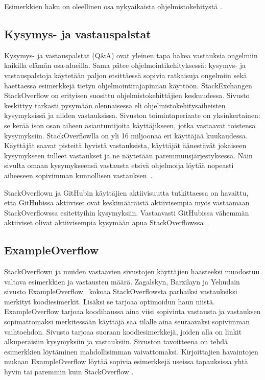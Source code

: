 \documentclass[finnish]{tktltiki2}
\theoremstyle{definition}
\theoremstyle{remark}
\begin{document}
Esimerkkien haku on oleellinen osa nykyaikaista ohjelmistokehitystä \cite{example-overflow-social-media-for-code-recommendations}.


\subsection{Kysymys- ja vastauspalstat}
Kysymys- ja vastauspalstat (Q\&A) ovat yleinen tapa hakea vastauksia ongelmiin kaikilla elämän osa-alueilla. Sama pätee ohjelmointikehityksessä: kysymys- ja vastauspalstoja käytetään paljon etsittäessä sopivia ratkaisuja ongelmiin sekä haettaessa esimerkkejä tietyn ohjelmointirajapinnan käyttöön. StackExchangen StackOverflow on erityisen suosittu ohjelmistokehittäjien keskuudessa. Sivusto keskittyy tarkasti pysymään olennaisessa eli ohjelmistokehitysaiheisten kysymyksissä ja niiden vastauksissa. Sivuston toimintaperiaate on yksinkertainen: se kerää ison osan aiheen asiantuntijoita käyttäjikseen, jotka vastaavat toistensa kysymyksiin. StackOverflowlla on yli 16 miljoonaa eri käyttäjää kuukaudessa. Käyttäjät saavat pisteitä hyvistä vastauksista, käyttäjät äänestävät jokaiseen kysymykseen tulleet vastaukset ja ne näytetään paremmuusjärjestyksessä. Näin sivulta omaan kysymykseensä vastausta etsivä ohjelmoija löytää nopeasti aiheeseen sopivimman kunnollisen vastauksen~\cite{social-networking-meets-se}.

StackOverflown ja GitHubin käyttäjien aktiivisuutta tutkittaessa on havaittu, että GitHubissa aktiiviset ovat keskimääräistä aktiivisempia myös vastaamaan StackOverflowssa esitettyihin kysymyksiin. Vastaavasti GitHubissa vähemmän aktiiviset olivat aktiivisempia kysymään apua StackOverflowssa~\cite{stackoverflow-and-github}.

\subsection{ExampleOverflow}
StackOverflown ja muiden vastaavien sivustojen käyttäjien haasteeksi muodostuu valtava esimerkkien ja vastausten määrä. Zagalskyn, Barzilayn ja Yehudain sivusto ExampleOverflow~\cite{example-overflow-social-media-for-code-recommendations} kokoaa StackOverflowsta parhaiksi vastauksiksi merkityt koodiesimerkit. Lisäksi se tarjoaa optimoidun haun niistä. ExampleOverflow tarjoaa koodihaussa aina viisi sopivinta vastausta ja vastauksen sopimattomaksi merkitessään käyttäjä saa tilalle aina seuraavaksi sopivimman vaihtoehdon. Sivusto tarjoaa suoraan koodiesimerkkejä, joiden alla on linkit alkuperäisiin kysymyksiin ja vastauksiin. Sivuston tavoitteena on tehdä esimerkkien löytäminen mahdollisimman vaivattomaksi. Kirjoittajien havaintojen mukaan ExampleOverflow löytää sopivia esimerkkejä useissa tapauksissa yhtä hyvin tai paremmin kuin StackOverflow \cite{example-overflow-social-media-for-code-recommendations}.
\end{document}
